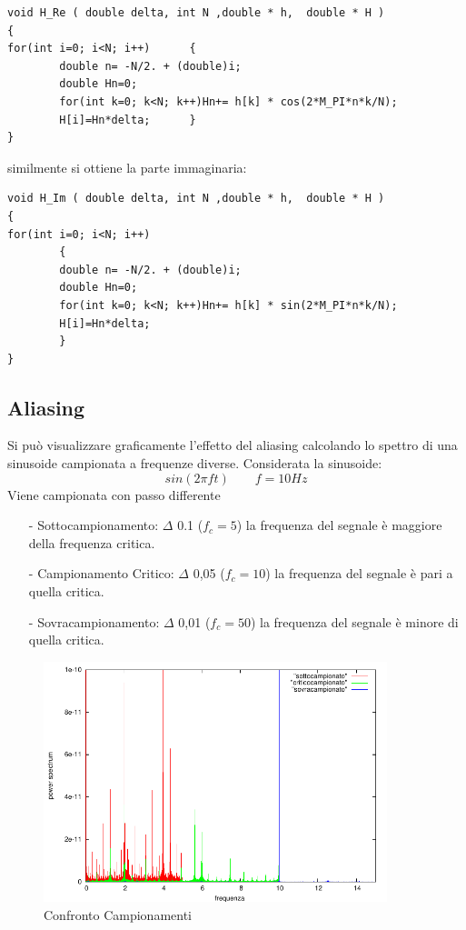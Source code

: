 \documentclass[13pt]{article}
\begin{document}
\begin{lstlisting}[frame=single]
void H_Re ( double delta, int N ,double * h,  double * H ) 
{
for(int i=0; i<N; i++)		{
		double n= -N/2. + (double)i;
		double Hn=0;
		for(int k=0; k<N; k++)Hn+= h[k] * cos(2*M_PI*n*k/N);
		H[i]=Hn*delta;		}
}
\end{lstlisting}

similmente si ottiene la parte immaginaria:

\begin{lstlisting}[frame=single]
void H_Im ( double delta, int N ,double * h,  double * H )
{
for(int i=0; i<N; i++)
		{
		double n= -N/2. + (double)i;
		double Hn=0;
		for(int k=0; k<N; k++)Hn+= h[k] * sin(2*M_PI*n*k/N);
		H[i]=Hn*delta;
		}
}
\end{lstlisting}


\subsection{Aliasing}

Si può visualizzare graficamente l'effetto del aliasing calcolando lo spettro di una sinusoide campionata a frequenze diverse.
Considerata la sinusoide:
$$ sin( 2\pi f t) \qquad f=10 Hz $$
Viene campionata con passo differente 
	\begin{itemize}
	\item[-] Sottocampionamento: $\Delta$ 0.1 ($f_{c} = 5 $) la frequenza del segnale è maggiore della frequenza critica.
	\item[-] Campionamento Critico: $\Delta$ 0,05 ($f_{c} = 10 $) la frequenza del segnale è pari a quella critica.
	\item[-] Sovracampionamento: $\Delta$ 0,01 ($f_{c} = 50 $) la frequenza del segnale è minore di quella critica.
	\end{itemize} 

\begin{figure}[!h]
\caption{Confronto Campionamenti}
\label{fig:aliasing}
\includegraphics[width=10cm,keepaspectratio]{picture/confronto_aliasing}
\centering
\end{figure}
\end{document}
